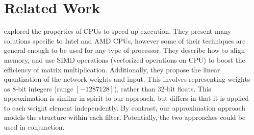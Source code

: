 






\section{Related Work}


\cite{vanhoucke2011improving} explored the
properties of CPUs to speed up execution.  They present many solutions
specific to Intel and AMD CPUs, however some of their techniques are
general enough to be used for any type of processor.  They describe
how to align memory, and use SIMD operations (vectorized operations on
CPU) to boost the efficiency of matrix multiplication.  Additionally, they
propose the linear quantization of the network weights and input. This
involves representing weights as 8-bit integers (range
$[-1287 128]$), rather than 32-bit floats. This approximation is
similar in spirit to our approach, but differs in that it is applied
to each weight element independently. By contrast, our approximation approach models
the structure within each filter. Potentially, the two approaches
could be used in conjunction. 

